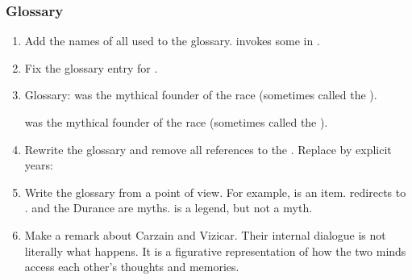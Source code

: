 \subsubsection{Glossary}
\begin{enumerate}
  \item 
    Add the names of all \xss{} used to the glossary. 
    \Ishnaruchaefir{} invokes some in . 
    
  \item 
    Fix the glossary entry for . 
  
  \item 
    Glossary: 
    \Sethicus was the mythical founder of the \draconian race (sometimes called the ).
    
    \Thanatzil was the mythical founder of the \resphan race (sometimes called the ).
    
  \item 
    Rewrite the glossary and remove all references to the . 
    Replace by explicit years:
  
  \item 
    Write the glossary from a \resphan point of view. 
    For example,  is an item.
    \quo{\Secondbanewar} redirects to .
    \Sethicus and the Durance are myths.
    \Thanatzil is a legend, but not a myth.
  
  \item 
    Make a remark about Carzain and Vizicar.
    Their internal dialogue is not literally what happens.
    It is a figurative representation of how the two minds access each other's thoughts and memories. 
\end{enumerate}





